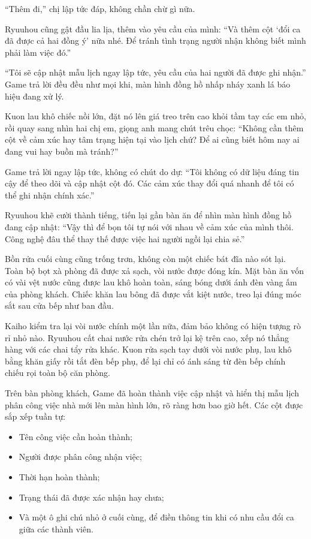 \documentclass[../main.tex]{subfiles}
\begin{document}
``Thêm đi,'' chị lập tức đáp, không chần chừ gì nữa.

Ryuuhou cũng gật đầu lia lịa, thêm vào yêu cầu của mình: ``Và thêm cột `đổi ca đã được cả hai đồng ý' nữa nhé. Để tránh tình trạng người nhận không biết mình phải làm việc đó.''

``Tôi sẽ cập nhật mẫu lịch ngay lập tức, yêu cầu của hai người đã được ghi nhận.'' Game trả lời đều đều như mọi khi, màn hình đồng hồ nhấp nháy xanh lá báo hiệu đang xử lý.

Kuon lau khô chiếc nồi lớn, đặt nó lên giá treo trên cao khỏi tầm tay các em nhỏ, rồi quay sang nhìn hai chị em, giọng anh mang chút trêu chọc: ``Không cần thêm cột về cảm xúc hay tâm trạng hiện tại vào lịch chứ? Để ai cũng biết hôm nay ai đang vui hay buồn mà tránh?''

Game trả lời ngay lập tức, không có chút do dự: ``Tôi không có dữ liệu đáng tin cậy để theo dõi và cập nhật cột đó. Các cảm xúc thay đổi quá nhanh để tôi có thể ghi nhận chính xác.''

Ryuuhou khẽ cười thành tiếng, tiến lại gần bàn ăn để nhìn màn hình đồng hồ đang cập nhật: ``Vậy thì để bọn tôi tự nói với nhau về cảm xúc của mình thôi. Công nghệ đâu thể thay thế được việc hai người ngồi lại chia sẻ.''

\ct

Bồn rửa cuối cùng cũng trống trơn, không còn một chiếc bát đĩa nào sót lại. Toàn bộ bọt xà phòng đã được xả sạch, vòi nước được đóng kín. Mặt bàn ăn vốn có vài vệt nước cũng được lau khô hoàn toàn, sáng bóng dưới ánh đèn vàng ấm của phòng khách. Chiếc khăn lau bông đã được vắt kiệt nước, treo lại đúng móc sắt sau cửa bếp như ban đầu.

Kaiho kiểm tra lại vòi nước chính một lần nữa, đảm bảo không có hiện tượng rò rỉ nhỏ nào. Ryuuhou cất chai nước rửa chén trở lại kệ trên cao, xếp nó thẳng hàng với các chai tẩy rửa khác. Kuon rửa sạch tay dưới vòi nước phụ, lau khô bằng khăn giấy rồi tắt đèn bếp phụ, để lại chỉ có ánh sáng từ đèn bếp chính chiếu rọi toàn bộ căn phòng.

Trên bàn phòng khách, Game đã hoàn thành việc cập nhật và hiển thị mẫu lịch phân công việc nhà mới lên màn hình lớn, rõ ràng hơn bao giờ hết. Các cột được sắp xếp tuần tự:

\begin{itemize}
    \item Tên công việc cần hoàn thành;
    \item Người được phân công nhận việc;
    \item Thời hạn hoàn thành;
    \item Trạng thái đã được xác nhận hay chưa;
    \item Và một ô ghi chú nhỏ ở cuối cùng, để điền thông tin khi có nhu cầu đổi ca giữa các thành viên.
\end{itemize}
\end{document}
